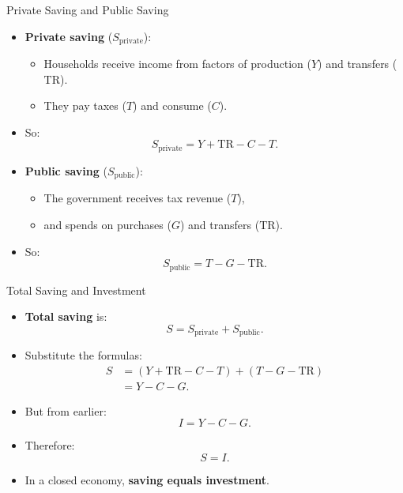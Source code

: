 \documentclass[aspectratio=169]{beamer}
\begin{document}
\begin{frame}{Private Saving and Public Saving}
\transfade
\begin{itemize}[<+->]
  \item \textbf{Private saving} (\(S_{\text{private}}\)):
  \begin{itemize}[<+->]
    \item Households receive income from factors of production (\(Y\)) and transfers (\(\text{TR}\)).
    \item They pay taxes (\(T\)) and consume (\(C\)).
  \end{itemize}
  \item So:
  \[
    S_{\text{private}} = Y + \text{TR} - C - T.
  \]
  \item \textbf{Public saving} (\(S_{\text{public}}\)):
  \begin{itemize}[<+->]
    \item The government receives tax revenue (\(T\)),
    \item and spends on purchases (\(G\)) and transfers (\(\text{TR}\)).
  \end{itemize}
  \item So:
  \[
    S_{\text{public}} = T - G - \text{TR}.
  \]
\end{itemize}
\end{frame}

\begin{frame}{Total Saving and Investment}
\transfade
\begin{itemize}[<+->]
  \item \textbf{Total saving} is:
  \[
    S = S_{\text{private}} + S_{\text{public}}.
  \]
  \item Substitute the formulas:
  \begin{align*}
    S &= (Y + \text{TR} - C - T) + (T - G - \text{TR}) \\
      &= Y - C - G.
  \end{align*}
  \item But from earlier:
  \[
    I = Y - C - G.
  \]
  \item Therefore:
  \[
    S = I.
  \]
  \item In a closed economy, \textbf{saving equals investment}.
\end{itemize}
\end{frame}
\end{document}
